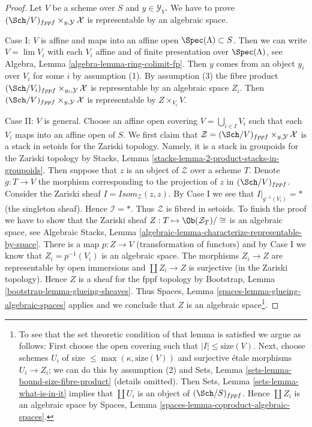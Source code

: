 \begin{proof}
Let $V$ be a scheme over $S$ and $y \in \mathcal{Y}_V$. We have to prove
$(\Sch/V)_{fppf} \times_{y, \mathcal{Y}} \mathcal{X}$ is representable
by an algebraic space.

\medskip\noindent
Case I: $V$ is affine and maps into an affine open $\Spec(\Lambda) \subset S$.
Then we can write $V = \lim V_i$ with each $V_i$ affine and of finite
presentation over $\Spec(\Lambda)$, see
Algebra, Lemma \ref{algebra-lemma-ring-colimit-fp}.
Then $y$ comes from an object $y_i$ over $V_i$ for some $i$ by assumption (1).
By assumption (3) the fibre product
$(\Sch/V_i)_{fppf} \times_{y_i, \mathcal{Y}} \mathcal{X}$ is representable
by an algebraic space $Z_i$. Then 
$(\Sch/V)_{fppf} \times_{y, \mathcal{Y}} \mathcal{X}$ is representable
by $Z \times_{V_i} V$.

\medskip\noindent
Case II: $V$ is general. Choose an affine open covering
$V = \bigcup_{i \in I} V_i$ such that each $V_i$ maps into an affine open
of $S$. We first claim
that $\mathcal{Z} = (\Sch/V)_{fppf} \times_{y, \mathcal{Y}} \mathcal{X}$
is a stack in setoids for the Zariski topology. Namely, it is a stack in
groupoids for the Zariski topology by
Stacks, Lemma \ref{stacks-lemma-2-product-stacks-in-groupoids}.
Then suppose that $z$ is an object of $\mathcal{Z}$ over a scheme $T$.
Denote $g : T \to V$ the morphism corresponding to the
projection of $z$ in $(\Sch/V)_{fppf}$. Consider the Zariski sheaf
$\mathit{I} = \mathit{Isom}_{\mathcal{Z}}(z, z)$. By Case I we see that
$\mathit{I}|_{g^{-1}(V_i)} = *$ (the singleton sheaf). Hence
$\mathcal{I} = *$. Thus $\mathcal{Z}$ is fibred in setoids. To finish
the proof we have to show that the Zariski sheaf
$Z : T \mapsto \Ob(\mathcal{Z}_T)/\cong$ is an algebraic space, see
Algebraic Stacks, Lemma
\ref{algebraic-lemma-characterize-representable-by-space}.
There is a map $p : Z \to V$ (transformation of functors) and by Case I
we know that $Z_i = p^{-1}(V_i)$ is an algebraic space. The morphisms
$Z_i \to Z$ are representable by open immersions and
$\coprod Z_i \to Z$ is surjective (in the Zariski topology).
Hence $Z$ is a sheaf for the fppf topology by
Bootstrap, Lemma \ref{bootstrap-lemma-glueing-sheaves}.
Thus Spaces, Lemma \ref{spaces-lemma-glueing-algebraic-spaces}
applies and we conclude that $Z$ is an algebraic space\footnote{
To see that the set theoretic condition of that lemma is satisfied
we argue as follows: First choose the open covering such that
$|I| \leq \text{size}(V)$. Next, choose schemes $U_i$ of size
$\leq \max(\kappa, \text{size}(V))$ and surjective \'etale morphisms
$U_i \to Z_i$; we can do this by assumption (2) and
Sets, Lemma \ref{sets-lemma-bound-size-fibre-product}
(details omitted). Then
Sets, Lemma \ref{sets-lemma-what-is-in-it}
implies that $\coprod U_i$ is an object of $(\Sch/S)_{fppf}$.
Hence $\coprod Z_i$ is an algebraic space by
Spaces, Lemma \ref{spaces-lemma-coproduct-algebraic-spaces}.
}.
\end{proof}

